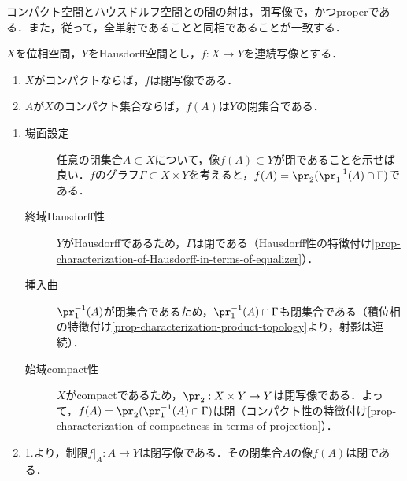 \documentclass[uplatex,dvipdfmx]{jsreport}
\begin{document}
\begin{tcolorbox}[colframe=ForestGreen, colback=ForestGreen!10!white, breakable ,colbacktitle=ForestGreen!40!white, coltitle=black,fonttitle=\bfseries\sffamily
    ,title=コンパクト空間とハウスドルフ空間との間のHom集合]
    コンパクト空間とハウスドルフ空間との間の射は，閉写像で，かつproperである．また，従って，全単射であることと同相であることが一致する．
\end{tcolorbox}

\begin{proposition}[閉写像補題]\label{prop-continuous-map-from-compact-to-Hausdorff}
    $X$を位相空間，$Y$をHausdorff空間とし，$f:X\to Y$を連続写像とする．
    \begin{enumerate}
        \item $X$がコンパクトならば，$f$は閉写像である．
        \item $A$が$X$のコンパクト集合ならば，$f(A)$は$Y$の閉集合である．
    \end{enumerate}
\end{proposition}
\begin{Proof}\mbox{}
    \begin{enumerate}
        \item \begin{description}
            \item[場面設定] 任意の閉集合$A\subset X$について，像$f(A)\subset Y$が閉であることを示せば良い．$f$のグラフ$\Gamma\subset X\times Y$を考えると，$f(A)=\pr_2(\pr_1^{-1}(A)\cap\Gamma)$である．
            \item[終域Hausdorff性] $Y$がHausdorffであるため，$\Gamma$は閉である（Hausdorff性の特徴付け\ref{prop-characterization-of-Hausdorff-in-terms-of-equalizer}）．
            \item[挿入曲] $\pr_1^{-1}(A)$が閉集合であるため，$\pr_1^{-1}(A)\cap\Gamma$も閉集合である（積位相の特徴付け\ref{prop-characterization-product-topology}より，射影は連続）．
            \item[始域compact性] $X$がcompactであるため，$\pr_2:X\times Y\to Y$は閉写像である．よって，$f(A)=\pr_2(\pr_1^{-1}(A)\cap\Gamma)$は閉（コンパクト性の特徴付け\ref{prop-characterization-of-compactness-in-terms-of-projection}）．
        \end{description}
        \item 
        1.より，制限$f|_A:A\to Y$は閉写像である．その閉集合$A$の像$f(A)$は閉である．
    \end{enumerate}
\end{Proof}
\end{document}

